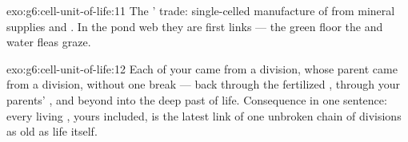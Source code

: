 \begin{solution}{exo:g6:cell-unit-of-life:11}
The ' trade: single-celled manufacture of  from mineral supplies and . In the pond web
they are first links --- the green floor the  and
water fleas graze.
\end{solution}

\begin{solution}{exo:g6:cell-unit-of-life:12}
Each of your  came from a division, whose parent 
came from a division, without one break --- back through
the fertilized , through your parents' , and
beyond into the deep past of life. Consequence in one
sentence: every living , yours included, is the latest
link of one unbroken chain of divisions as old as life
itself.
\end{solution}

